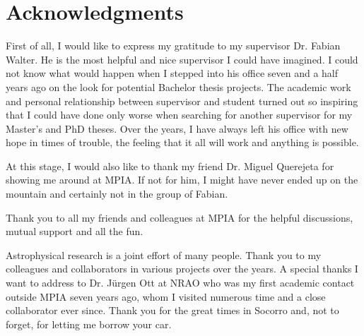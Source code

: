 



\bigskip

\begingroup
\let\clearpage\relax
\let\cleardoublepage\relax
\let\cleardoublepage\relax

\chapter*{Acknowledgments}

First of all, I would like to express my gratitude to my supervisor Dr. Fabian Walter. He is the most helpful and nice supervisor I could have imagined. I could not know what would happen when I stepped into his office seven and a half years ago on the look for potential Bachelor thesis projects. The academic work and personal relationship between supervisor and student turned out so inspiring that I could have done only worse when searching for another supervisor for my Master's and PhD theses. Over the years, I have always left his office with new hope in times of trouble, the feeling that it all will work and anything is possible.

At this stage, I would also like to thank my friend Dr. Miguel Querejeta for showing me around at MPIA. If not for him, I might have never ended up on the mountain and certainly not in the group of Fabian.

Thank you to all my friends and colleagues at MPIA for the helpful discussions, mutual support and all the fun.

Astrophysical research is a joint effort of many people. Thank you to my colleagues and collaborators in various projects over the years.
A special thanks I want to address to Dr. J\"urgen Ott at NRAO who was my first academic contact outside MPIA seven years ago, whom I visited numerous time and a close collaborator ever since. Thank you for the great times in Socorro and, not to forget, for letting me borrow your car.


